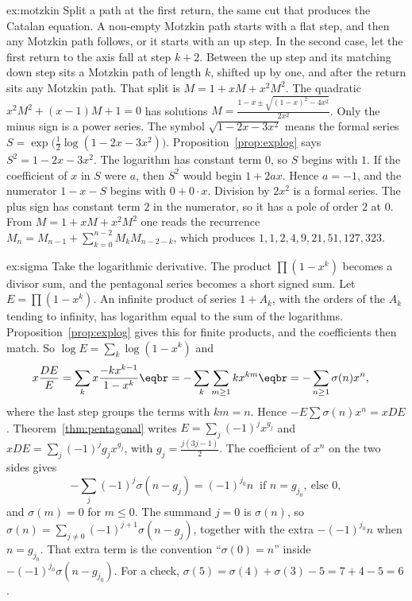 \begin{solution}{ex:motzkin}
\idea Split a path at the first return, the same cut that produces the Catalan equation.
\writeup A non-empty Motzkin path starts with a flat step, and then any Motzkin path follows, or it starts with an up step.
In the second case, let the first return to the axis fall at step $k+2$. Between the up step and its matching down step
sits a Motzkin path of length $k$, shifted up by one, and after the return sits any Motzkin path. That split is $M=1+xM+x^2M^2$. The quadratic
$x^2M^2+(x-1)M+1=0$ has solutions $M=\frac{1-x\pm\sqrt{(1-x)^2-4x^2}}{2x^2}$. Only the minus sign is a power series. The symbol $\sqrt{1-2x-3x^2}$ means the formal series $S=\exp\bigl(\frac12\log(1-2x-3x^2)\bigr)$.
Proposition~\ref{prop:explog} says $S^2=1-2x-3x^2$. The logarithm has constant term $0$, so $S$ begins with $1$. If the coefficient of $x$ in $S$ were $a$, then $S^2$ would begin $1+2ax$. Hence $a=-1$, and the numerator $1-x-S$ begins with $0+0\cdot x$. Division by $2x^2$ is a formal series. The plus
sign has constant term $2$ in the numerator, so it has a pole of order $2$ at $0$. From $M=1+xM+x^2M^2$ one reads the recurrence $M_n=M_{n-1}+\sum_{k=0}^{n-2}M_kM_{n-2-k}$, which produces $1,1,2,4,9,21,51,127,323$.
\end{solution}

\begin{solution}{ex:sigma}
\idea Take the logarithmic derivative. The product $\prod(1-x^k)$ becomes a divisor sum, and the pentagonal series becomes a short signed sum.
\writeup Let $E=\prod(1-x^k)$. An infinite product of series $1+A_k$, with the orders of the $A_k$ tending to
infinity, has logarithm equal to the sum of the logarithms. Proposition~\ref{prop:explog} gives this for finite products, and the coefficients then match.
So $\log E=\sum_k\log(1-x^k)$ and
\[
\begin{aligned}x\frac{DE}E&=\sum_kx\frac{-kx^{k-1}}{1-x^k}\eqbr=-\sum_k\sum_{m\ge1}kx^{km}\eqbr=-\sum_{n\ge1}\sigma(n)x^n,\end{aligned}
\]
where the last step groups the terms with $km=n$. Hence $-E\sum\sigma(n)x^n=xDE$. Theorem~\ref{thm:pentagonal} writes $E=\sum_j(-1)^jx^{g_j}$ and
$xDE=\sum_j(-1)^jg_jx^{g_j}$, with $g_j=\frac{j(3j-1)}2$. The coefficient of $x^n$ on the two sides gives
\[
-\sum_j(-1)^j\sigma(n-g_j)=(-1)^{j_0}n\ \text{ if }n=g_{j_0},\ \text{else }0,
\]
and $\sigma(m)=0$ for $m\le0$. The summand $j=0$ is $\sigma(n)$, so $\sigma(n)=\sum_{j\ne0}(-1)^{j+1}\sigma(n-g_j)$, together with the extra $-(-1)^{j_0}n$
when $n=g_{j_0}$. That extra term is the convention ``$\sigma(0)=n$'' inside $-(-1)^{j_0}\sigma(n-g_{j_0})$. For a check, $\sigma(5)=\sigma(4)+\sigma(3)-5=7+4-5=6$.
\end{solution}

